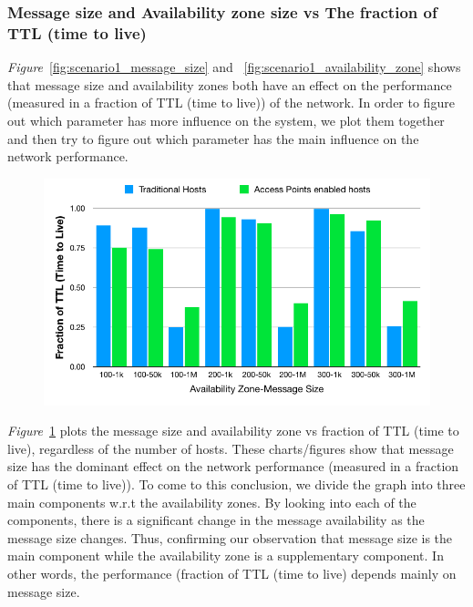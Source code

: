 {\subsubsection{Message size and Availability zone size vs The fraction of TTL (time to live)}
\emph{Figure}~\ref{fig:scenario1_message_size} and ~\ref{fig:scenario1_availability_zone} shows that message size and availability zones both have an effect on the performance (measured in a fraction of TTL (time to live)) of the network. In order to figure out which parameter has more influence on the system, we plot them together and then try to figure out which parameter has the main influence on the network performance.
\begin{figure}[H]
  \centering
  \includegraphics[scale=0.55]{./figures/scenario1_message_size_availability_zone_1}
  \label{fig:scenario1_message_size_availability_zone_1}
\end{figure}
\emph{Figure}~\ref{fig:scenario1_message_size_availability_zone_1} plots the message size and availability zone vs fraction of TTL (time to live), regardless of the number of hosts. These charts/figures show that message size has the dominant effect on the network performance (measured in a fraction of TTL (time to live)). To come to this conclusion, we divide the graph into three main components w.r.t the availability zones. By looking into each of the components, there is a significant change in the message availability as the message size changes. Thus, confirming our observation that message size is the main component while the availability zone is a supplementary component. In other words, the performance (fraction of TTL (time to live) depends mainly on message size.\newline
}
